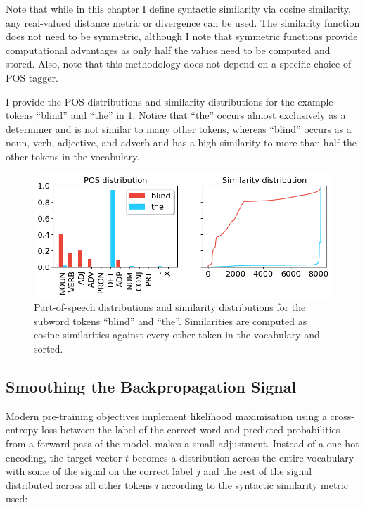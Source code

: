 Note that while in this chapter I define syntactic similarity via cosine similarity, any real-valued distance metric or divergence can be used. The similarity function does not need to be symmetric, although I note that symmetric functions provide computational advantages as only half the values need to be computed and stored. Also, note that this methodology does not depend on a specific choice of POS tagger.

I provide the POS distributions and similarity distributions for the example tokens ``blind'' and ``the'' in \cref{fig:distributions}. Notice that ``the'' occurs almost exclusively as a determiner and is not similar to many other tokens, whereas ``blind'' occurs as a noun, verb, adjective, and adverb and has a high similarity to more than half the other tokens in the vocabulary.

\begin{figure}[ht!]
    \centering
    \includegraphics[width=0.8\linewidth]{chapters/syntatic-smoothing/figures/distributions.png}
    \caption{Part-of-speech distributions and similarity distributions for the subword tokens ``blind'' and ``the''. Similarities are computed as cosine-similarities against every other token in the vocabulary and sorted.}
    \label{fig:distributions}
    \vspace{-1em}
\end{figure}

\subsection{Smoothing the Backpropagation Signal}
\label{section:smoothing}

Modern pre-training objectives implement likelihood maximisation using a cross-entropy loss between the label of the correct word and predicted probabilities from a forward pass of the model. \smoothing makes a small adjustment. Instead of a one-hot encoding, the target vector $t$ becomes a distribution across the entire vocabulary with some of the signal on the correct label $j$ and the rest of the signal distributed across all other tokens $i$ according to the syntactic similarity metric used:

